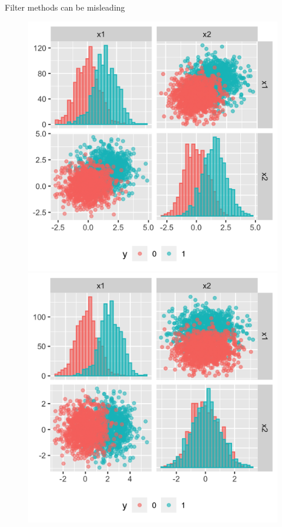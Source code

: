 \documentclass[11pt,compress,t,notes=noshow, xcolor=table]{beamer}
\begin{document}
  \begin{vbframe}{Filter methods can be misleading}

   \begin{figure}
    \centering
    \begin{minipage}{0.45\textwidth}
        \centering
        \includegraphics[width=\textwidth]{figure/guyon_example_presumably_redundant.png} %
    \end{minipage}\hfill
    \begin{minipage}{0.45\textwidth}
        \centering
        \includegraphics[width=\textwidth]{figure/guyon_example_presumably_redundant_rotated.png} %

\end{minipage}
\end{figure}
\end{vbframe}
\end{document}
